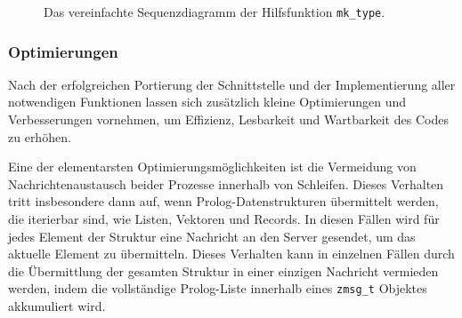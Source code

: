 \begin{figure}[!ht]
  \caption{Das vereinfachte Sequenzdiagramm der Hilfsfunktion \texttt{mk\_type}.}
  \label{fig:mk-type-sequence}
\end{figure}

\subsubsection{Optimierungen}
\label{subsec:optimizations}

Nach der erfolgreichen Portierung der Schnittstelle und der Implementierung aller notwendigen Funktionen
lassen sich zusätzlich kleine Optimierungen und Verbesserungen vornehmen, um Effizienz, Lesbarkeit und Wartbarkeit des Codes zu erhöhen.

Eine der elementarsten Optimierungsmöglichkeiten ist die Vermeidung von Nachrichtenaustausch beider Prozesse
innerhalb von Schleifen. Dieses Verhalten tritt insbesondere dann auf, wenn Prolog-Datenstrukturen übermittelt werden,
die iterierbar sind, wie Listen, Vektoren und Records.
In diesen Fällen wird für jedes Element der Struktur eine Nachricht an den Server gesendet,
um das aktuelle Element zu übermitteln.
Dieses Verhalten kann in einzelnen Fällen durch die Übermittlung der gesamten Struktur in einer einzigen Nachricht vermieden werden,
indem die vollständige Prolog-Liste innerhalb eines \texttt{zmsg\_t} Objektes akkumuliert wird.

